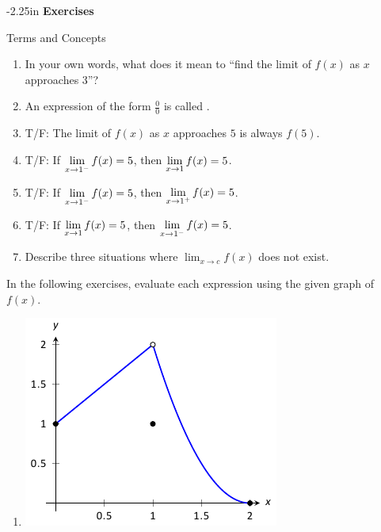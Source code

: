 \begin{adjustwidth*}{}{-2.25in}
\textbf{{\large Exercises}}
\setlength{\columnsep}{25pt}
\begin{multicols*}{2}
\noindent Terms and Concepts \small

\begin{enumerate}[1)]
\item In your own words, what does it mean to ``find the limit of $f(x)$ as $x$ approaches 3''?
\item An expression of the form $\frac00$ is called \underline{\hskip 15pt}.
\item T/F: The limit of $f(x)$ as $x$ approaches $5$ is always $f(5)$.
\item T/F: If $\displaystyle \lim_{x\to 1^-} f(x) = 5$, then $\displaystyle \lim_{x\to 1} f(x) = 5$.
\item T/F: If $\displaystyle \lim_{x\to 1^-} f(x) = 5$, then $\displaystyle \lim_{x\to 1^+} f(x) = 5$.
\item T/F: If $\displaystyle \lim_{x\to 1} f(x) = 5$, then $\displaystyle \lim_{x\to 1^-} f(x) = 5$.
\item Describe three situations where $\displaystyle \lim_{x\to c}f(x)$ does not exist.
\end{enumerate} 

 \small

\noindent In the following exercises, evaluate each expression using the given graph of $f(x)$.

\begin{enumerate}[1),resume]
\item 
\begin{minipage}{\linewidth}\centering
\includegraphics[scale=.8]{figures/fig01_04_ex_05}
\end{minipage}


\end{enumerate}
\end{multicols*}
\end{adjustwidth*}
